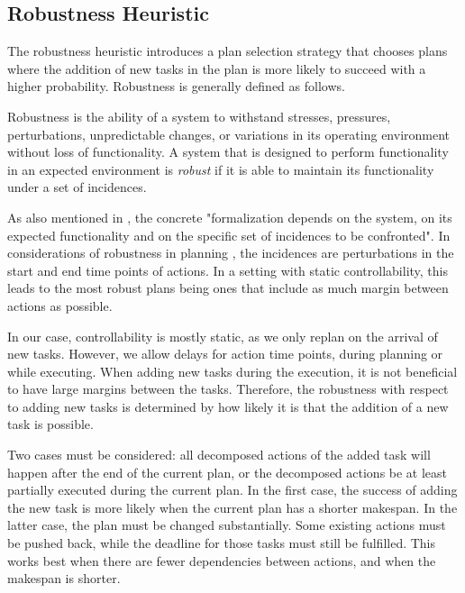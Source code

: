 \subsection{Robustness Heuristic}
\label{sec:approach-robustness}

The robustness heuristic introduces a plan selection strategy that chooses plans where the addition of new tasks in the plan is more likely to succeed with a higher probability.
Robustness is generally defined as follows.

\begin{definition}[Robustness]
    Robustness is the ability of a system to withstand stresses, pressures, perturbations, unpredictable changes, or variations in its operating environment without loss of functionality.
    A system that is designed to perform functionality in an expected environment is \emph{robust} if it is able to maintain its functionality under a set of incidences. \citep{barberRobustnessStabilityRecoverability2015}
\end{definition}

As also mentioned in \cite{barberRobustnessStabilityRecoverability2015}, the concrete "formalization depends on the system, on its expected functionality and on the specific set of incidences to be confronted".
In considerations of robustness in planning \citep{lundRobustExecutionProbabilistic2017}, the incidences are perturbations in the start and end time points of actions.
In a setting with static controllability, this leads to the most robust plans being ones that include as much margin between actions as possible.

In our case, controllability is mostly static, as we only replan on the arrival of new tasks.
However, we allow delays for action time points, during planning or while executing.
When adding new tasks during the execution, it is not beneficial to have large margins between the tasks.
Therefore, the robustness with respect to adding new tasks is determined by how likely it is that the addition of a new task is possible.

Two cases must be considered: all decomposed actions of the added task will happen after the end of the current plan, or the decomposed actions be at least partially executed during the current plan.
In the first case, the success of adding the new task is more likely when the current plan has a shorter makespan.
In the latter case, the plan must be changed substantially.
Some existing actions must be pushed back, while the deadline for those tasks must still be fulfilled.
This works best when there are fewer dependencies between actions, and when the makespan is shorter.

